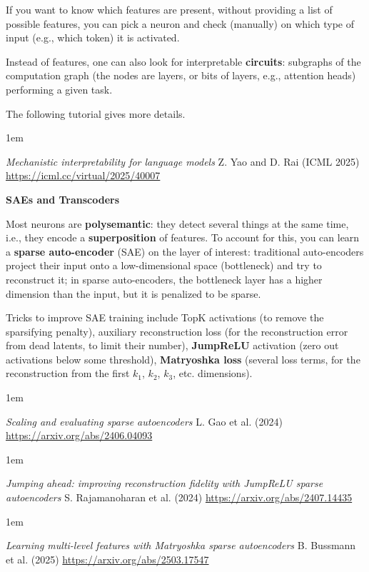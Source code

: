 \documentclass[a5paper]{article}
\let\d\textbf
\newenvironment{reference}{%
  \medskip\goodbreak
  \parskip 0pt
  \raggedright
  \leftskip 1em
  \obeylines
}{\par\medskip\goodbreak}
\def\subsection#1{{\par\bigskip\goodbreak\large\bfseries #1\par}}
\begin{document}
If you want to know which features are present, without providing a list of possible features,
you can pick a neuron and check (manually) on which type of input (e.g., which token)
it is activated.

Instead of features, one can also look for interpretable \d{circuits}:
subgraphs of the computation graph (the nodes are layers, or bits of layers, e.g., attention heads)
performing a given task.

The following tutorial gives more details.

\begin{reference}
  \emph{Mechanistic interpretability  for language models}
  Z. Yao and D. Rai (ICML 2025)
  \url{https://icml.cc/virtual/2025/40007}
\end{reference}

\subsection{SAEs and Transcoders}

Most neurons are \d{polysemantic}: they detect several things at the same time,
i.e., they encode a \d{superposition} of features.
To account for this, you can learn a \d{sparse auto-encoder} (SAE) on the layer of interest:
traditional auto-encoders project their input onto a low-dimensional space (bottleneck)
and try to reconstruct it; in sparse auto-encoders, the bottleneck layer has a higher dimension than the input,
but it is penalized to be sparse.

Tricks to improve SAE training include
TopK activations (to remove the sparsifying penalty),
auxiliary reconstruction loss (for the reconstruction error from dead latents, to limit their number),
\d{JumpReLU} activation (zero out activations below some threshold),
\d{Matryoshka loss} (several loss terms, for the reconstruction from the first $k_1$, $k_2$, $k_3$, etc. dimensions).

\begin{reference}
  \emph{Scaling and evaluating sparse autoencoders}
  L. Gao et al. (2024)
  \url{https://arxiv.org/abs/2406.04093}
\end{reference}

\begin{reference}
  \emph{Jumping ahead: improving reconstruction fidelity with JumpReLU sparse autoencoders}
  S. Rajamanoharan et al. (2024)
  \url{https://arxiv.org/abs/2407.14435}
\end{reference}

\begin{reference}
  \emph{Learning multi-level features  with Matryoshka sparse autoencoders}
  B. Bussmann et al. (2025)
  \url{https://arxiv.org/abs/2503.17547}
\end{reference}
\end{document}
